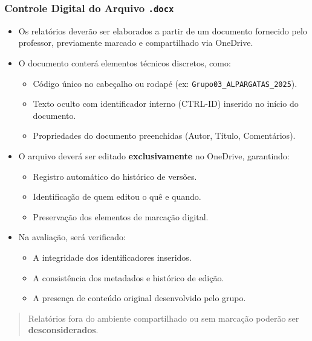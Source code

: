 \documentclass[
  a4paper,
]{book}
\providecommand{\tightlist}{%
  \setlength{\itemsep}{0pt}\setlength{\parskip}{0pt}}\usepackage{longtable,booktabs,array}
\begin{document}
\subsubsection{\texorpdfstring{Controle Digital do Arquivo
\texttt{.docx}}{Controle Digital do Arquivo .docx}}\label{controle-digital-do-arquivo-.docx}

\begin{itemize}
\item
  Os relatórios deverão ser elaborados a partir de um documento
  fornecido pelo professor, previamente marcado e compartilhado via
  OneDrive.
\item
  O documento conterá elementos técnicos discretos, como:

  \begin{itemize}
  \tightlist
  \item
    Código único no cabeçalho ou rodapé (ex:
    \texttt{Grupo03\_ALPARGATAS\_2025}).
  \item
    Texto oculto com identificador interno (CTRL-ID) inserido no início
    do documento.
  \item
    Propriedades do documento preenchidas (Autor, Título, Comentários).
  \end{itemize}
\item
  O arquivo deverá ser editado \textbf{exclusivamente} no OneDrive,
  garantindo:

  \begin{itemize}
  \tightlist
  \item
    Registro automático do histórico de versões.
  \item
    Identificação de quem editou o quê e quando.
  \item
    Preservação dos elementos de marcação digital.
  \end{itemize}
\item
  Na avaliação, será verificado:

  \begin{itemize}
  \tightlist
  \item
    A integridade dos identificadores inseridos.
  \item
    A consistência dos metadados e histórico de edição.
  \item
    A presença de conteúdo original desenvolvido pelo grupo.
  \end{itemize}
\end{itemize}

\begin{quote}
Relatórios fora do ambiente compartilhado ou sem marcação poderão ser
\textbf{desconsiderados}.
\end{quote}
\end{document}
